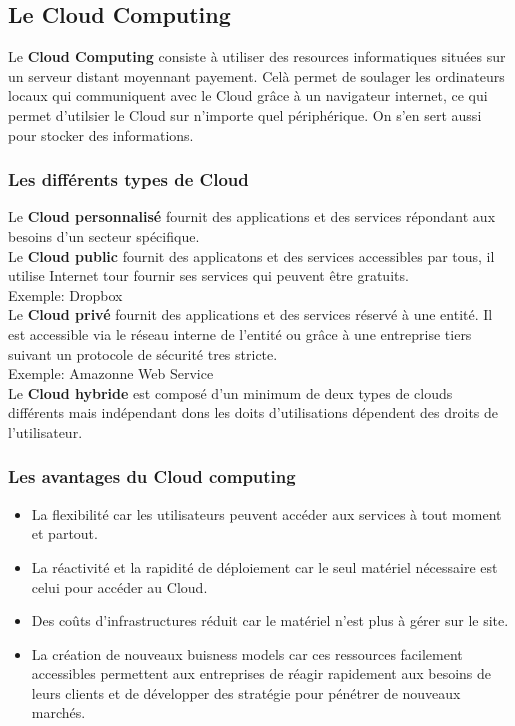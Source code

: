 \documentclass[10pt,a4paper]{article}
\begin{document}
 \subsection{Le Cloud Computing}
 Le \textbf{Cloud Computing} consiste à utiliser des resources informatiques situées sur un serveur distant moyennant payement. Celà permet de soulager les ordinateurs locaux qui communiquent avec le Cloud grâce à un navigateur internet, ce qui permet d'utilsier le Cloud sur n'importe quel périphérique. On s'en sert aussi pour stocker des informations.
 \subsubsection{Les différents types de Cloud}
 Le \textbf{Cloud personnalisé} fournit des applications et des services répondant aux besoins d'un secteur spécifique.\\

 \indent
 Le \textbf{Cloud public} fournit des applicatons et des services accessibles par tous, il utilise Internet tour fournir ses services qui peuvent être gratuits.\\
 Exemple: Dropbox\\

 \indent
 Le \textbf{Cloud privé} fournit des applications et des services réservé à une entité. Il est accessible via le réseau interne de l'entité ou grâce à une entreprise tiers suivant un protocole de sécurité tres stricte.\\
 Exemple: Amazonne Web Service\\

 \indent
 Le \textbf{Cloud hybride} est composé d'un minimum de deux types de clouds différents mais indépendant dons les doits d'utilisations dépendent des droits de l'utilisateur.

 \subsubsection{Les avantages du Cloud computing}
 \begin{itemize}
	 \item La flexibilité car les utilisateurs peuvent accéder aux services à tout moment et partout.
	 \item La réactivité et la rapidité de déploiement car le seul matériel nécessaire est celui pour accéder au Cloud.
	 \item Des coûts d'infrastructures réduit car le matériel n'est plus à gérer sur le site.%
	 \item La création de nouveaux buisness models car ces ressources facilement accessibles permettent aux entreprises de réagir rapidement aux besoins de leurs clients et de développer des stratégie pour pénétrer de nouveaux marchés.
 \end{itemize}
\end{document}
